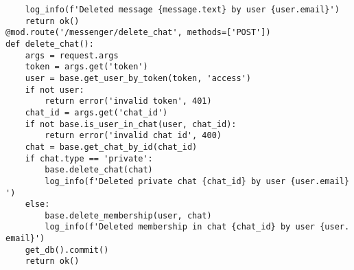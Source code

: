 \documentclass[listing]{espd}
\begin{document}
\begin{verbatim}
    log_info(f'Deleted message {message.text} by user {user.email}')
    return ok()
@mod.route('/messenger/delete_chat', methods=['POST'])
def delete_chat():
    args = request.args
    token = args.get('token')
    user = base.get_user_by_token(token, 'access')
    if not user:
        return error('invalid token', 401)
    chat_id = args.get('chat_id')
    if not base.is_user_in_chat(user, chat_id):
        return error('invalid chat id', 400)
    chat = base.get_chat_by_id(chat_id)
    if chat.type == 'private':
        base.delete_chat(chat)
        log_info(f'Deleted private chat {chat_id} by user {user.email}
')
    else:
        base.delete_membership(user, chat)
        log_info(f'Deleted membership in chat {chat_id} by user {user.
email}')
    get_db().commit()
    return ok()
\end{verbatim}
\end{document}
